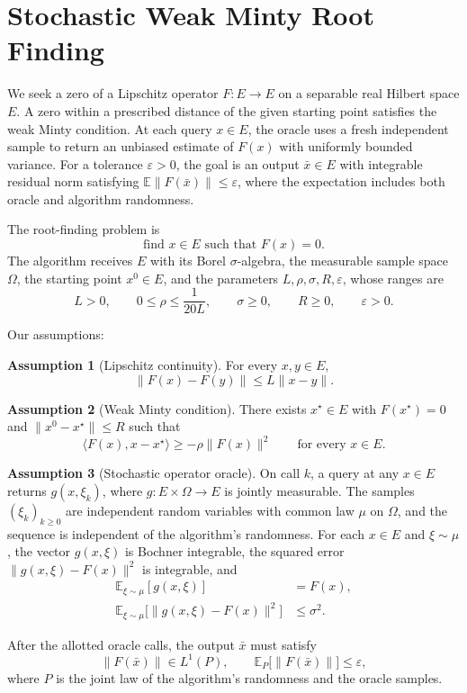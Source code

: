 \documentclass[10pt]{article}
\theoremstyle{definition}
\newtheorem{assumption}{Assumption}
\begin{document}
\section*{Stochastic Weak Minty Root Finding}
We seek a zero of a Lipschitz operator $F:E\to E$ on a separable real Hilbert space $E$. A zero within a prescribed distance of the given starting point satisfies the weak Minty condition. At each query $x\in E$, the oracle uses a fresh independent sample to return an unbiased estimate of $F(x)$ with uniformly bounded variance. For a tolerance $\varepsilon>0$, the goal is an output $\bar{x}\in E$ with integrable residual norm satisfying $\mathbb{E}\|F(\bar{x})\|\leq\varepsilon$, where the expectation includes both oracle and algorithm randomness.

The root-finding problem is
\[
\text{find }x\in E\text{ such that }F(x)=0.
\]
The algorithm receives $E$ with its Borel $\sigma$-algebra, the measurable sample space $\Omega$, the starting point $x^0\in E$, and the parameters $L,\rho,\sigma,R,\varepsilon$, whose ranges are
\[
L>0,\qquad 0\leq\rho\leq\frac{1}{20L},\qquad \sigma\geq 0,\qquad R\geq 0,\qquad \varepsilon>0.
\]

Our assumptions:
\begin{assumption}[Lipschitz continuity]
For every $x,y\in E$,
\[
\|F(x)-F(y)\|\leq L\|x-y\|.
\]
\end{assumption}

\begin{assumption}[Weak Minty condition]
There exists $x^\star\in E$ with $F(x^\star)=0$ and $\|x^0-x^\star\|\leq R$ such that
\[
\langle F(x),x-x^\star\rangle\geq-\rho\|F(x)\|^2
\qquad\text{for every }x\in E.
\]
\end{assumption}

\begin{assumption}[Stochastic operator oracle]
On call $k$, a query at any $x\in E$ returns $g(x,\xi_k)$, where $g:E\times\Omega\to E$ is jointly measurable. The samples $(\xi_k)_{k\geq 0}$ are independent random variables with common law $\mu$ on $\Omega$, and the sequence is independent of the algorithm's randomness. For each $x\in E$ and $\xi\sim\mu$, the vector $g(x,\xi)$ is Bochner integrable, the squared error $\|g(x,\xi)-F(x)\|^2$ is integrable, and
\[
\begin{aligned}
\mathbb{E}_{\xi\sim\mu}[g(x,\xi)] &= F(x),\\
\mathbb{E}_{\xi\sim\mu}\bigl[\|g(x,\xi)-F(x)\|^2\bigr] &\leq \sigma^2.
\end{aligned}
\]
\end{assumption}

After the allotted oracle calls, the output $\bar{x}$ must satisfy
\[
\|F(\bar{x})\|\in L^1(P),\qquad
\mathbb{E}_{P}\bigl[\|F(\bar{x})\|\bigr]\leq\varepsilon,
\]
where $P$ is the joint law of the algorithm's randomness and the oracle samples.
\end{document}

